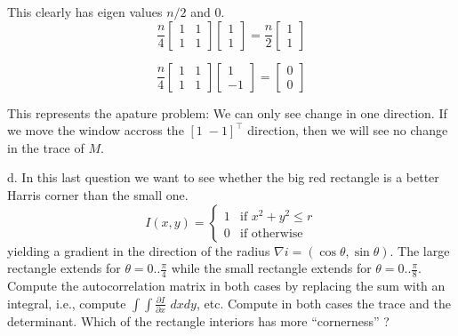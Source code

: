 \documentclass[11pt,english]{article}
\begin{document}
\begin{enumerate}
This clearly has eigen values $n/2$ and $0$.
\[
\frac{n}{4} \begin{bmatrix}
           1 & 1 \\
           1 & 1 
   \end{bmatrix} 
 \begin{bmatrix}
           1  \\
           1  
   \end{bmatrix} =
 \frac{n}{2} \begin{bmatrix}
           1  \\
           1  
   \end{bmatrix} 
\]

\[
\frac{n}{4} \begin{bmatrix}
           1 & 1 \\
           1 & 1 
   \end{bmatrix} 
 \begin{bmatrix}
           1  \\
          -1  
   \end{bmatrix} =
   \begin{bmatrix}
           0  \\
           0  
   \end{bmatrix} 
\]

This represents the apature problem: We can only see change in one direction. If we move the window accross the
$[ 1 \; -1 ]^\top$ direction, then we will see no change in the trace of $M$. 

d. In this last question we want to see whether the big red rectangle is a better Harris corner than the small one. 
\[
I(x,y) = \left\{
	\begin{array}{ll}
		1  & \mbox{if } x^2+y^2  \leq r\\
		0 & \mbox{if } \mbox{otherwise}
	\end{array}
\right.
\]
yielding a  gradient in the direction of the radius $\nabla i = (\cos\theta,\sin\theta)$.
The large rectangle extends for $\theta=0..\frac{\pi}{4}$ while the small rectangle extends for  $\theta=0..\frac{\pi}{8}$. Compute the autocorrelation matrix in both cases by replacing the sum with an integral, i.e., compute $\int\int \frac{\partial{I}}{\partial{x}}\,\,dxdy$, etc. Compute in both cases the trace and the determinant. Which of the rectangle interiors has more ``cornerness'' ?



\end{enumerate}
\end{document}
